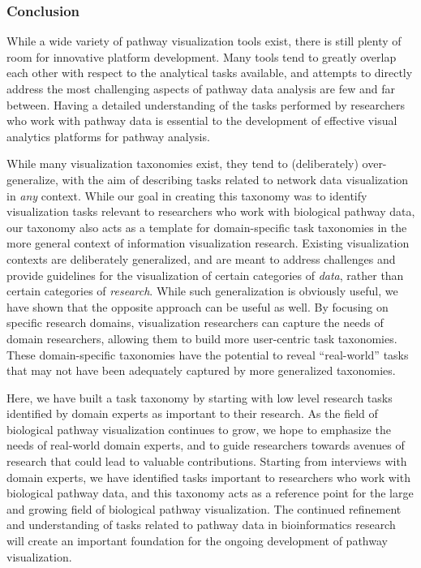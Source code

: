 \documentclass[twocolumn]{bmcart}%
\begin{document}
\subsubsection*{Conclusion}

While a wide variety of pathway visualization tools exist, there is still plenty of room for innovative platform development.
Many tools tend to greatly overlap each other with respect to the analytical tasks available, and attempts to directly address the most challenging aspects of pathway data analysis are few and far between.
Having a detailed understanding of the tasks performed by researchers who work with pathway data is essential to the development of effective visual analytics platforms for pathway analysis.

While many visualization taxonomies exist, they tend to (deliberately) over-generalize, with the aim of describing tasks related to network data visualization in \textit{any} context.
While our goal in creating this taxonomy was to identify visualization tasks relevant to researchers who work with biological pathway data, our taxonomy also acts as a template for domain-specific task taxonomies in the more general context of information visualization research.
Existing visualization contexts are deliberately generalized, and are meant to address challenges and provide guidelines for the visualization of certain categories of \textit{data}, rather than certain categories of \textit{research}.
While such generalization is obviously useful, we have shown that the opposite approach can be useful as well.
By focusing on specific research domains, visualization researchers can capture the needs of domain researchers, allowing them to build more user-centric task taxonomies.
These domain-specific taxonomies have the potential to reveal ``real-world'' tasks that may not have been adequately captured by more generalized taxonomies.

Here, we have built a task taxonomy by starting with low level research tasks identified by domain experts as important to their research.
As the field of biological pathway visualization continues to grow, we hope to emphasize the needs of real-world domain experts, and to guide researchers towards avenues of research that could lead to valuable contributions.
Starting from interviews with domain experts, we have identified tasks important to researchers who work with biological pathway data, and this taxonomy acts as a reference point for the large and growing field of biological pathway visualization.
The continued refinement and understanding of tasks related to pathway data in bioinformatics research will create an important foundation for the ongoing development of pathway visualization.
\end{document}
